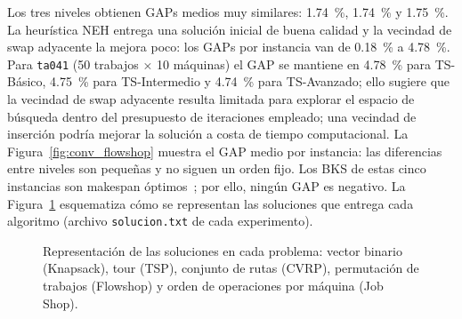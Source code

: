 Los tres niveles obtienen GAPs medios muy similares:
\SI{1.74}{\percent}, \SI{1.74}{\percent} y \SI{1.75}{\percent}.
La heurística NEH entrega una solución inicial de buena calidad y la
vecindad de swap adyacente la mejora poco: los GAPs por instancia van de
\SI{0.18}{\percent} a \SI{4.78}{\percent}.
Para \texttt{ta041} (50 trabajos × 10 máquinas) el GAP se mantiene en
\SI{4.78}{\percent} para TS-Básico, \SI{4.75}{\percent} para TS-Intermedio y
\SI{4.74}{\percent} para TS-Avanzado; ello sugiere que la vecindad de swap
adyacente resulta limitada para explorar el espacio de búsqueda dentro del
presupuesto de iteraciones empleado; una vecindad de inserción podría
mejorar la solución a costa de tiempo computacional.
La Figura~\ref{fig:conv_flowshop} muestra el GAP medio por instancia: las
diferencias entre niveles son pequeñas y no siguen un orden fijo.
Los BKS de estas cinco instancias son makespan
óptimos~\cite{taillard1993benchmarks}; por ello, ningún GAP es negativo.
La Figura~\ref{fig:repr_soluciones} esquematiza cómo se representan las
soluciones que entrega cada algoritmo (archivo \texttt{solucion.txt} de
cada experimento).

\begin{figure}[t]
  \centering
  \caption{Representación de las soluciones en cada problema: vector
           binario (Knapsack), tour (TSP), conjunto de rutas (CVRP),
           permutación de trabajos (Flowshop) y orden de operaciones por
           máquina (Job Shop).}
  \label{fig:repr_soluciones}
\end{figure}

